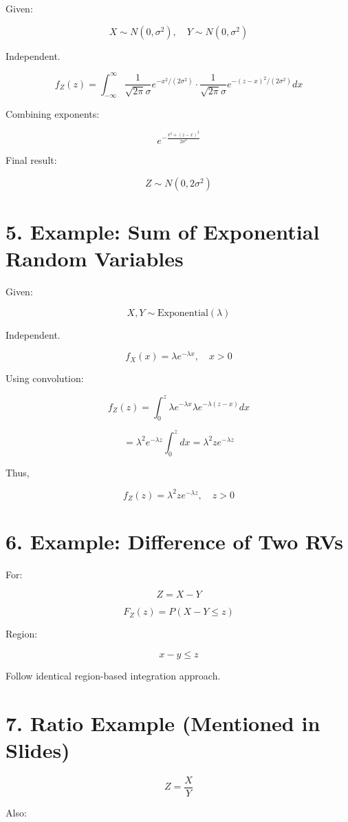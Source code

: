 \documentclass[12pt]{article}
\begin{document}
Given:

\[
X \sim N(0,\sigma^2),
\quad
Y \sim N(0,\sigma^2)
\]

Independent.

\[
f_Z(z)
=
\int_{-\infty}^{\infty}
\frac{1}{\sqrt{2\pi}\sigma}
e^{-x^2/(2\sigma^2)}
\cdot
\frac{1}{\sqrt{2\pi}\sigma}
e^{-(z-x)^2/(2\sigma^2)}
dx
\]

Combining exponents:

\[
e^{-\frac{x^2+(z-x)^2}{2\sigma^2}}
\]

Final result:

\[
\boxed{
Z \sim N(0, 2\sigma^2)
}
\]

\section*{5. Example: Sum of Exponential Random Variables}

Given:

\[
X, Y \sim \text{Exponential}(\lambda)
\]

Independent.

\[
f_X(x) = \lambda e^{-\lambda x}, \quad x>0
\]

Using convolution:

\[
f_Z(z)
=
\int_0^z
\lambda e^{-\lambda x}
\lambda e^{-\lambda(z-x)}
dx
\]

\[
=
\lambda^2 e^{-\lambda z}
\int_0^z dx
=
\lambda^2 z e^{-\lambda z}
\]

Thus,

\[
\boxed{
f_Z(z)
=
\lambda^2 z e^{-\lambda z}, \quad z>0
}
\]

\section*{6. Example: Difference of Two RVs}

For:

\[
Z = X - Y
\]

\[
F_Z(z) = P(X - Y \le z)
\]

Region:

\[
x - y \le z
\]

Follow identical region-based integration approach.

\section*{7. Ratio Example (Mentioned in Slides)}

\[
Z = \frac{X}{Y}
\]

Also:
\end{document}
